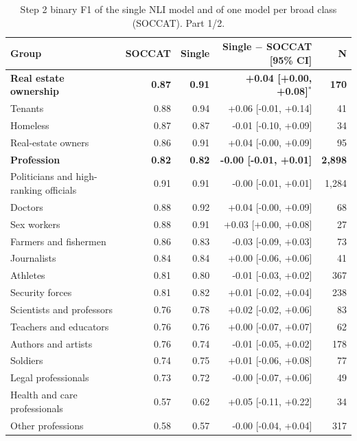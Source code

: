 \begin{table}[htbp]
\centering
\scriptsize
\begin{threeparttable}
\caption{Step 2 binary F1 of the single NLI model and of one model per broad class (SOCCAT). Part 1/2.}
\label{tab:single-nli-part1}
\begin{tabular}{l rr r r}
\toprule
Group & SOCCAT & Single & Single $-$ SOCCAT [95\% CI] & N \\
\midrule
\textbf{Real estate ownership} & \textbf{0.87} & \textbf{0.91} & \textbf{+0.04 [+0.00, +0.08]$^{*}$} & \textbf{170} \\
\quad Tenants & 0.88 & 0.94 & +0.06 [-0.01, +0.14] & 41 \\
\quad Homeless & 0.87 & 0.87 & -0.01 [-0.10, +0.09] & 34 \\
\quad Real-estate owners & 0.86 & 0.91 & +0.04 [-0.00, +0.09] & 95 \\
\addlinespace
\textbf{Profession} & \textbf{0.82} & \textbf{0.82} & \textbf{-0.00 [-0.01, +0.01]} & \textbf{2,898} \\
\quad Politicians and high-ranking officials & 0.91 & 0.91 & -0.00 [-0.01, +0.01] & 1,284 \\
\quad Doctors & 0.88 & 0.92 & +0.04 [-0.00, +0.09] & 68 \\
\quad Sex workers & 0.88 & 0.91 & +0.03 [+0.00, +0.08] & 27 \\
\quad Farmers and fishermen & 0.86 & 0.83 & -0.03 [-0.09, +0.03] & 73 \\
\quad Journalists & 0.84 & 0.84 & +0.00 [-0.06, +0.06] & 41 \\
\quad Athletes & 0.81 & 0.80 & -0.01 [-0.03, +0.02] & 367 \\
\quad Security forces & 0.81 & 0.82 & +0.01 [-0.02, +0.04] & 238 \\
\quad Scientists and professors & 0.76 & 0.78 & +0.02 [-0.02, +0.06] & 83 \\
\quad Teachers and educators & 0.76 & 0.76 & +0.00 [-0.07, +0.07] & 62 \\
\quad Authors and artists & 0.76 & 0.74 & -0.01 [-0.05, +0.02] & 178 \\
\quad Soldiers & 0.74 & 0.75 & +0.01 [-0.06, +0.08] & 77 \\
\quad Legal professionals & 0.73 & 0.72 & -0.00 [-0.07, +0.06] & 49 \\
\quad Health and care professionals & 0.57 & 0.62 & +0.05 [-0.11, +0.22] & 34 \\
\quad Other professions & 0.58 & 0.57 & -0.00 [-0.04, +0.04] & 317 \\

\end{tabular}
\end{threeparttable}
\end{table}
